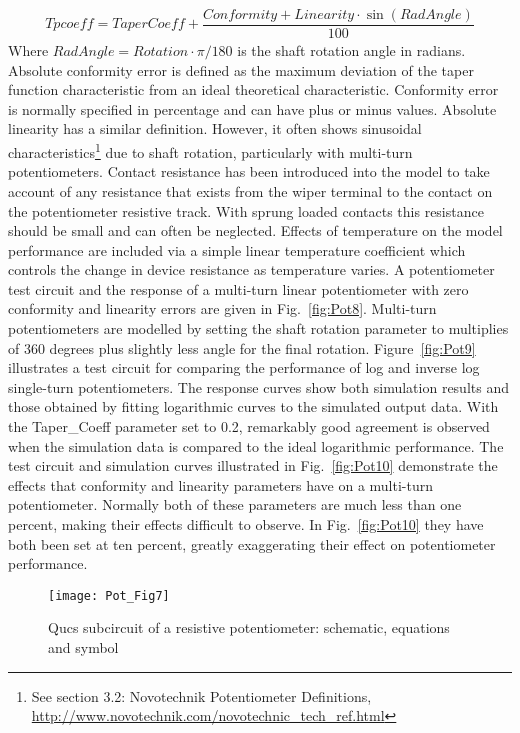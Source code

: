 \begin{align}
\label{eq:pequ5}
Tpcoeff=TaperCoeff+\dfrac{Conformity+Linearity\cdot \sin{\left( RadAngle  \right)}}{100}
\end{align}
Where $ RadAngle = Rotation \cdot \pi/180$ is the shaft rotation angle
in radians. Absolute conformity error is defined as the maximum
deviation of the taper function characteristic from an ideal
theoretical characteristic. Conformity error is normally specified in
percentage and can have plus or minus values. Absolute linearity has a
similar definition. However, it often shows sinusoidal
characteristics\footnote{See section 3.2: Novotechnik Potentiometer
Definitions,
\url{http://www.novotechnik.com/novotechnic_tech_ref.html}} due to
shaft rotation, particularly with multi-turn potentiometers. Contact
resistance has been introduced into the model to take account of any
resistance that exists from the wiper terminal to the contact on the
potentiometer resistive track. With sprung loaded contacts this
resistance should be small and can often be neglected. Effects of
temperature on the model performance are included via a simple linear
temperature coefficient which controls the change in device resistance
as temperature varies. A potentiometer test circuit and the response
of a multi-turn linear potentiometer with zero conformity and
linearity errors are given in Fig.~\ref{fig:Pot8}. Multi-turn
potentiometers are modelled by setting the shaft rotation parameter to
multiplies of 360 degrees plus slightly less angle for the final
rotation. Figure~\ref{fig:Pot9} illustrates a test circuit for
comparing the performance of log and inverse log single-turn
potentiometers. The response curves show both simulation results and
those obtained by fitting logarithmic curves to the simulated output
data. With the Taper\_Coeff parameter set to 0.2, remarkably good
agreement is observed when the simulation data is compared to the
ideal logarithmic performance. The test circuit and simulation curves
illustrated in Fig.~\ref{fig:Pot10} demonstrate the effects that
conformity and linearity parameters have on a multi-turn
potentiometer.  Normally both of these parameters are much less than
one percent, making their effects difficult to observe.  In
Fig.~\ref{fig:Pot10} they have both been set at ten percent, greatly
exaggerating their effect on potentiometer performance.

\begin{figure} [h] 
  \centering
  \texttt{[image: Pot\_Fig7]}
  \caption{Qucs subcircuit of a resistive potentiometer: schematic, equations and symbol}
  \label{fig:Pot7}
\end{figure} 

